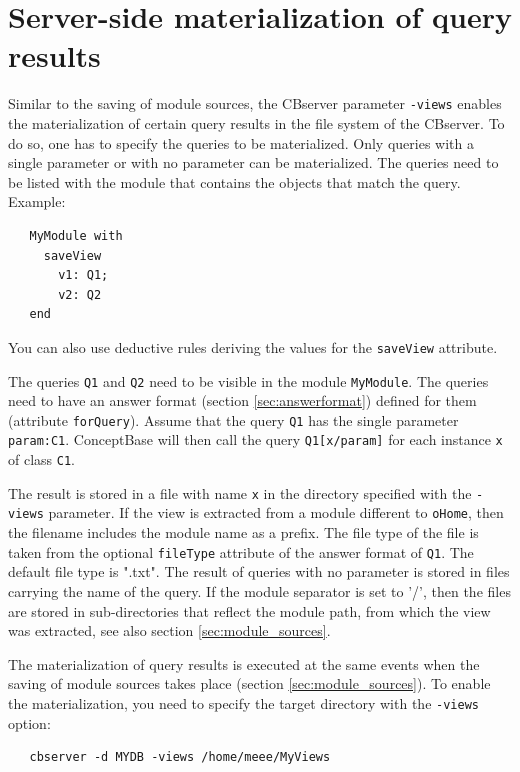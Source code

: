 \section{Server-side materialization of query results} \label{sec:module_views}

Similar to the saving of module sources, the CBserver parameter {\tt -views}
enables the materialization of certain query results in the file system of
the CBserver.
To do so, one has to specify the queries to be materialized. Only queries with a
single parameter or with no parameter can be materialized. The queries need to be listed with the
module that contains the objects that match the query. Example:

\begin{verbatim}
   MyModule with
     saveView
       v1: Q1;
       v2: Q2
   end
\end{verbatim}

You can also use deductive rules deriving the values for the {\tt saveView} attribute.

The queries {\tt Q1} and {\tt Q2} need to be visible in the module {\tt MyModule}.
The queries need to have an answer format (section \ref{sec:answerformat})
defined for them (attribute {\tt forQuery}).
Assume that the query {\tt Q1}  has the single parameter {\tt param:C1}. ConceptBase
will then call the query {\tt Q1[x/param]} for each instance {\tt x}  of class {\tt C1}.

The result is stored in a file with name {\tt x} in the directory specified with
the {\tt -views} parameter. If the view is extracted from a module different to
{\tt oHome}, then the filename includes the module name as a prefix. 
The file type of the file is taken from the optional
{\tt fileType} attribute of the answer format of {\tt Q1}. The default file type
is ".txt".
The result of queries with no parameter is stored in files carrying the name of the
query.
If the module separator is set to '/', then the files are stored in sub-directories
that reflect the module path, from which the view was extracted, see
also section \ref{sec:module_sources}.

The materialization of query results is executed at the same events when the 
saving of module sources takes place (section \ref{sec:module_sources}).
To enable the materialization, you need to 
specify the target directory with the {\tt -views} option:

\begin{verbatim}
   cbserver -d MYDB -views /home/meee/MyViews 
\end{verbatim}

